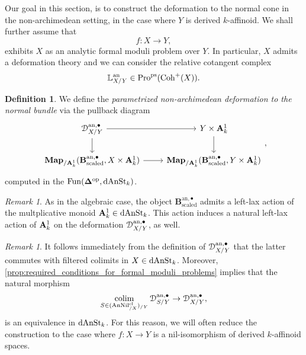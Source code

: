 \documentclass[10pt,a4paper,reqno]{amsart} %
\theoremstyle{plain}
\theoremstyle{definition}
\newtheorem{defin}[thm]{Definition}
\theoremstyle{remark}
\newtheorem{rem}[thm]{Remark}
\numberwithin{equation}{section}
\begin{document}
Our goal in this section, is to construct the deformation to the normal cone in the non-archimedean
setting, in the case where $Y$ is derived $k$-affinoid. We shall further assume that
    \[
        f \colon X \to Y,
    \]  
exhibits $X$ as an analytic formal moduli problem over $Y$. In particular, $X$ admits a deformation theory and we can
consider the relative cotangent complex
    \[
        \mathbb L^\mathrm{an}_{X/ Y} \in \mathrm{Pro}^\mathrm{ps}(\mathrm{Coh}^+(X)).  
    \]

\begin{defin}
    We define the \emph{parametrized non-archimedean deformation to the normal bundle} via the pullback diagram
    \[
    \begin{tikzcd}
        \cD_{X/Y}^{\mathrm{an}, \bullet} \ar{r} \ar{d} & Y \times \bA^1_k \ar{d} \\
        \bfMap_{/ \bA^1_k}(\mathbf{B}_\mathrm{scaled}^{\mathrm{an}, \bullet}, X \times \bA^1_k) \ar{r} & \bfMap_{/ \bA^1_k}(\mathbf{B}_{\mathrm{scaled}}^{\mathrm{an, \bullet}}, Y \times \bA^1_k)
    \end{tikzcd},
    \]
    computed in the \infcat $\mathrm{Fun}(\bm{\Delta} ^\mathrm{op}, \mathrm{dAnSt}_k)$.
\end{defin}

\begin{rem}
    As in the algebraic case, the object $\mathbf{B}^{\mathrm{an}, \bullet}_{\mathrm{scaled}}$ admits a left-lax action of the multplicative monoid $\mathbf A^1_k \in \mathrm{dAnSt}_k$.
    This action induces a natural left-lax action of $\mathbf A^1_k$ on the deformation $\mathcal D_{X/ Y}^{\mathrm{an}, \bullet}$, as well.
\end{rem}

\begin{rem} \label{rem:reduction_step_closed_ims}
    It follows immediately from the definition of $\mathcal D_{X/ Y}^{\mathrm{an}, \bullet}$ that the latter commutes with filtered colimits in $X \in \mathrm{dAnSt}_k$.
    Moreover, \cref{prop:required_conditions_for_formal_moduli_problems} implies that the natural morphism
        \[  
            \operatorname*{colim}_{S \in (\mathrm{AnNil}^{\mathrm{cl}}_{/ X})_{/ Y}} \mathcal D_{S/ Y}^{\mathrm{an}, \bullet} \to \mathcal D_{X/ Y}^{\mathrm{an}, \bullet},
        \]
    is an equivalence in $\mathrm{dAnSt}_k$. For this reason, we will often reduce the construction to the case where $f \colon X \to Y$ is a nil-isomorphism of derived $k$-affinoid
    spaces.
\end{rem}
\end{document}
